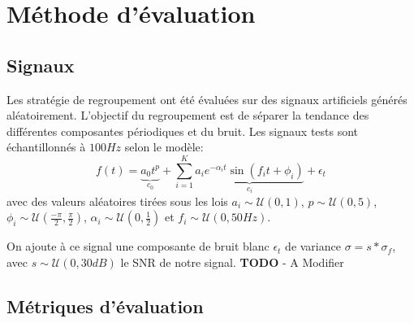 \documentclass{gretsi}
\newcommand{\set}[1]{\left \{ 1, \dots, #1 \right \}}
\begin{document}


\section{Méthode d'évaluation}
\label{sec:eval}

\subsection{Signaux}
\label{sub:artsig}

    Les stratégie de regroupement ont été évaluées sur des signaux artificiels générés aléatoirement. L'objectif du regroupement est de séparer la tendance des différentes composantes périodiques et du bruit. Les signaux tests sont échantillonnés à $100Hz$ selon le modèle:
    \begin{equation}\label{eq:artsig}
    f(t) = \underbrace{a_0 t^p}_{c_0} + \sum_{i=1}^K \underbrace{a_i e^{-\alpha_i t} \sin\left(f_i t + \phi_i\right)}_{c_i} + \epsilon_t
    \end{equation} avec des valeurs aléatoires tirées sous les lois $a_i \sim \mathcal U(0, 1)$, $p \sim \mathcal U(0, 5)$, $\displaystyle \phi_i \sim \mathcal U\left(\frac{-\pi}{2}, \frac{\pi}{2}\right)$, $\alpha_i \sim \mathcal U\left(0, \frac{1}{2}\right)$ et $f_i \sim \mathcal U(0, 50Hz)$.
    
    On ajoute à ce signal une composante de bruit blanc $\epsilon_t$ de variance $\sigma = s*\sigma_f$, avec $s \sim \mathcal U(0, 30dB)$ le SNR de notre signal.
{\color{red} \textbf{TODO} - A Modifier }

\subsection{Métriques d'évaluation}
\label{sub:met}
\end{document}
